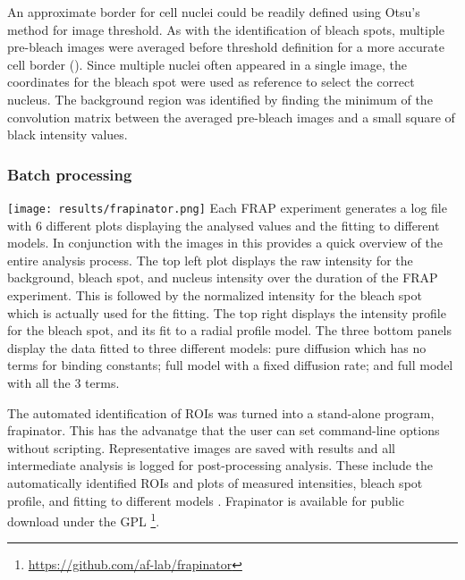       An approximate border for cell nuclei could be readily defined using Otsu's method for image threshold.
      As with the identification of bleach spots, multiple pre-bleach images
      were averaged before threshold definition for a more accurate cell border ().
      Since multiple nuclei often appeared in a single image, the coordinates for the bleach spot
      were used as reference to select the correct nucleus.
      The background region was identified by finding the minimum of the convolution matrix
      between the averaged pre-bleach images and a small square of black intensity values.

    \subsubsection{Batch processing}

      \begin{sidewaysfigure}
        \texttt{[image: results/frapinator.png]}
          {
            Each FRAP experiment generates a log file with 6 different plots
            displaying the analysed values and the fitting to different models.
            In conjunction with the images in  this
            provides a quick overview of the entire analysis process.
            The top left plot displays the raw intensity
            for the background, bleach spot, and nucleus intensity over the
            duration of the FRAP experiment. This is followed by the normalized
            intensity for the bleach spot which is actually used for the
            fitting. The top right displays the intensity
            profile for the bleach spot, and its fit to a radial profile
            model. The three bottom panels display the data fitted to three
            different models: pure diffusion which has no terms for binding
            constants; full model with a fixed diffusion rate; and full model
            with all the 3 terms.
          }
        \label{fig:kill-frap:frapinator}
      \end{sidewaysfigure}

      The automated identification of ROIs was turned into a stand-alone program, frapinator.
      This has the advanatge that the user can set command-line options without scripting.
      Representative images are saved with results and all intermediate analysis is logged for post-processing analysis.
      These include the automatically identified ROIs and
      plots of measured intensities, bleach spot profile, and fitting to different models .
      Frapinator is available for public download under the GPL \footnote{\url{https://github.com/af-lab/frapinator}}.

